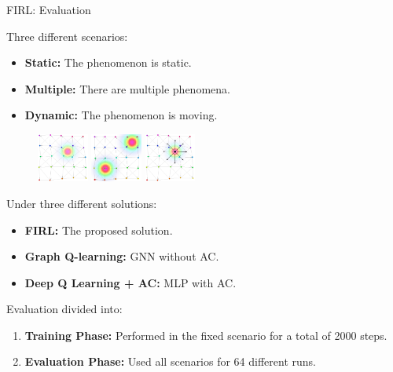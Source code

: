 \documentclass[presentation, 8pt,169]{beamer}\mode<presentation>{\usetheme{AMSBolognaFC}}
\begin{document}
\begin{frame}{FIRL: Evaluation}

    Three different scenarios:
    \begin{itemize}
      \item \textbf{Static:} The phenomenon is static.
      \item \textbf{Multiple:} There are multiple phenomena.
      \item \textbf{Dynamic:} The phenomenon is moving.
    \end{itemize}
    \begin{figure}
        \centering
        \includegraphics[width=0.15\textwidth]{img/base}
        \includegraphics[width=0.15\textwidth]{img/two}
        \includegraphics[width=0.15\textwidth]{img/moving}
    \end{figure}

    Under three different solutions:
    \begin{itemize}
      \item \textbf{FIRL:} The proposed solution.
      \item \textbf{Graph Q-learning:} GNN without AC.
      \item \textbf{Deep Q Learning + AC:} MLP with AC.
    \end{itemize}

Evaluation divided into:
  \begin{enumerate}
    \item \textbf{Training Phase:} Performed in the fixed scenario for a total of 2000 steps.
    \item \textbf{Evaluation Phase:} Used all scenarios for 64 different runs.
  \end{enumerate}
\end{frame}
\end{document}
